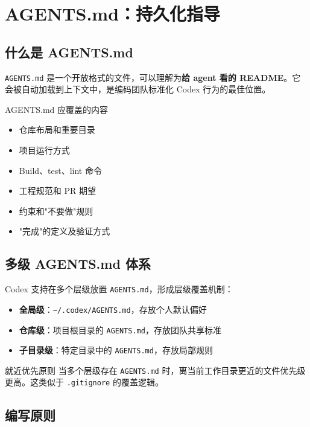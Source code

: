 \section{AGENTS.md：持久化指导}

\subsection{什么是 AGENTS.md}

\texttt{AGENTS.md} 是一个开放格式的文件，可以理解为\textbf{给 agent 看的 README}。它会被自动加载到上下文中，是编码团队标准化 Codex 行为的最佳位置。

\begin{importantbox}{AGENTS.md 应覆盖的内容}
\begin{itemize}[nosep]
    \item 仓库布局和重要目录
    \item 项目运行方式
    \item Build、test、lint 命令
    \item 工程规范和 PR 期望
    \item 约束和"不要做"规则
    \item "完成"的定义及验证方式
\end{itemize}
\end{importantbox}

\subsection{多级 AGENTS.md 体系}

Codex 支持在多个层级放置 \texttt{AGENTS.md}，形成层级覆盖机制：

\begin{itemize}
    \item \textbf{全局级}：\texttt{\textasciitilde/.codex/AGENTS.md}，存放个人默认偏好
    \item \textbf{仓库级}：项目根目录的 \texttt{AGENTS.md}，存放团队共享标准
    \item \textbf{子目录级}：特定目录中的 \texttt{AGENTS.md}，存放局部规则
\end{itemize}

\begin{knowledgebox}{就近优先原则}
当多个层级存在 \texttt{AGENTS.md} 时，离当前工作目录更近的文件优先级更高。这类似于 \texttt{.gitignore} 的覆盖逻辑。
\end{knowledgebox}

\subsection{编写原则}

